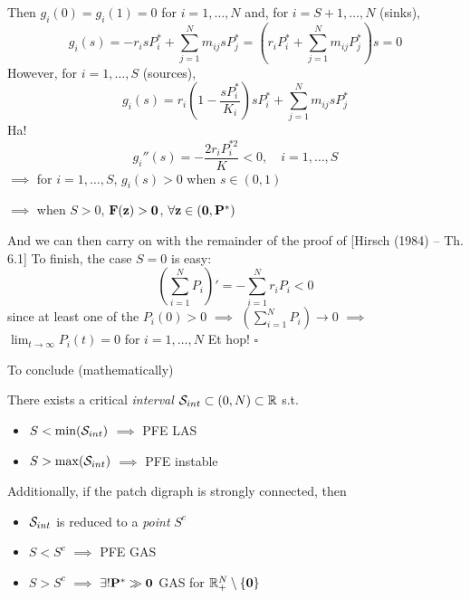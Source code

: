 \documentclass[aspectratio=169]{beamer}
\begin{document}
\begin{frame}
	Then $g_i(0)=g_i(1)=0$ for $i=1,\ldots,N$ and, for $i=S+1,\ldots,N$ 
	(sinks),
		\[
		g_i(s) = -r_isP_i^*+\sum_{j=1}^Nm_{ij}sP_j^*
		= \left(r_iP_i^*+\sum_{j=1}^Nm_{ij}P_j^*\right)s=0
		\]
		However, for $i=1,\ldots,S$ (sources),
		\[
		g_i(s) = r_i\left(1-\frac{sP_i^*}{K_i}\right)sP_i^*
		+\sum_{j=1}^Nm_{ij}sP_j^*
		\]
		Ha!
		\[
		g_i''(s)=-\frac{2r_iP_i^{*2}}{K}<0,\quad i=1,\ldots,S
		\]
		\vfill
		$\implies$ for $i=1,\ldots,S$, $g_i(s)>0$ when $s\in(0,1)$
		
		$\implies$ 
		when $S>0$, $\bF(\bz)>\b0$, $\forall\bz\in(\b0,\bP^*)$
		
\end{frame}
		
\begin{frame}
	And we can then carry on with the remainder of the proof of [Hirsch (1984) -- Th. 6.1]
	\vfill
	To finish, the case $S=0$ is easy: 
	\[
	\left(\sum_{i=1}^{N}{P_i}\right)' 
	= -\sum_{i=1}^N r_iP_i < 0
	\]
	since at least one of the $P_i(0)>0$ 
	\vfill 
	$\implies$ $\left(\sum_{i=1}^{N}{P_i}\right)\to 0$ $\implies$ $\lim_{t\to\infty}P_i(t)=0$ for $i=1,\ldots,N$
	\vfill
	Et hop! $\square$
\end{frame}

\begin{frame}{To conclude (mathematically)}
	\begin{theorem}\label{th:main_result}
		There exists a critical \emph{interval} $\S_{int}\subset(0,N)\subset\IR$ s.t.
		\begin{itemize}
			\item $S<\min(\S_{int})$ $\implies$ PFE LAS
			\item $S>\max(\S_{int})$ $\implies$ PFE instable
		\end{itemize}
		\vskip0.5cm
		Additionally, if the patch digraph is strongly connected, then
		\begin{itemize}
			\item $\S_{int}$ is reduced to a \emph{point}  $S^c$
			\item $S<S^c$ $\implies$ PFE GAS
			\item $S>S^c$ $\implies$ $\exists!\bP^*\gg\b0$ GAS for $\IR_+^N\setminus\{\b0\}$
		\end{itemize}
	\end{theorem}
\end{frame}



\end{document}
